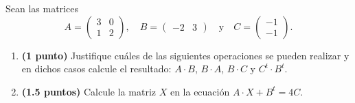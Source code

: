
Sean las matrices
\[
A=\begin{pmatrix}3&0\\1&2\end{pmatrix},\quad B=\begin{pmatrix}-2&3\end{pmatrix}\quad\text{y}\quad C=\begin{pmatrix}-1\\-1\end{pmatrix}.
\]
\begin{enumerate}[label=\alph*)]
\item \textbf{(1 punto)} Justifique cuáles de las siguientes operaciones se pueden realizar y en dichos casos calcule el resultado: $A\cdot B$, $B\cdot A$, $B\cdot C$ y $C^t\cdot B^t$.
\item \textbf{(1.5 puntos)} Calcule la matriz $X$ en la ecuación $A\cdot X+B^t=4C$.
\end{enumerate}
